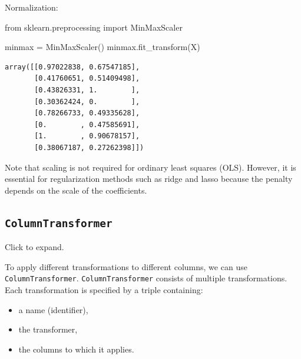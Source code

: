 \documentclass[
  letterpaper,
  DIV=11,
  numbers=noendperiod]{scrreprt}
\newenvironment{Shaded}{\begin{snugshade}}{\end{snugshade}}
\newcommand{\ImportTok}[1]{\textcolor[rgb]{0.00,0.46,0.62}{#1}}
\newcommand{\NormalTok}[1]{\textcolor[rgb]{0.00,0.23,0.31}{#1}}
\newcommand{\OperatorTok}[1]{\textcolor[rgb]{0.37,0.37,0.37}{#1}}
\providecommand{\tightlist}{%
  \setlength{\itemsep}{0pt}\setlength{\parskip}{0pt}}
\theoremstyle{definition}
\theoremstyle{definition}
\theoremstyle{plain}
\theoremstyle{plain}
\theoremstyle{remark}
\begin{document}
Normalization:

\begin{Shaded}
\begin{Highlighting}[]
\ImportTok{from}\NormalTok{ sklearn.preprocessing }\ImportTok{import}\NormalTok{ MinMaxScaler}

\NormalTok{minmax }\OperatorTok{=}\NormalTok{ MinMaxScaler()}
\NormalTok{minmax.fit\_transform(X)}
\end{Highlighting}
\end{Shaded}

\begin{verbatim}
array([[0.97022838, 0.67547185],
       [0.41760651, 0.51409498],
       [0.43826331, 1.        ],
       [0.30362424, 0.        ],
       [0.78266733, 0.49335628],
       [0.        , 0.47585691],
       [1.        , 0.90678157],
       [0.38067187, 0.27262398]])
\end{verbatim}

Note that scaling is not required for ordinary least squares (OLS).
However, it is essential for regularization methods such as ridge and
lasso because the penalty depends on the scale of the coefficients.

\subsection{\texorpdfstring{\texttt{ColumnTransformer}}{ColumnTransformer}}\label{columntransformer}

Click to expand.

To apply different transformations to different columns, we can use
\texttt{ColumnTransformer}. \texttt{ColumnTransformer} consists of
multiple transformations. Each transformation is specified by a triple
containing:

\begin{itemize}
\tightlist
\item
  a name (identifier),
\item
  the transformer,
\item
  the columns to which it applies.
\end{itemize}
\end{document}

